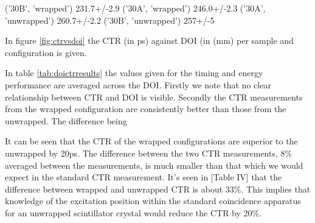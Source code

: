 ('30B', 'wrapped') 231.7+/-2.9
('30A', 'wrapped') 246.0+/-2.3
('30A', 'unwrapped') 260.7+/-2.2
('30B', 'unwrapped') 257+/-5

In figure \ref{fig:ctrvsdoi} the CTR (in ps) against DOI (in (mm) per sample and configuration is given. 

In table \ref{tab:doictrresults} the values given for the timing and energy performance are averaged across the DOI. Firstly we note that no clear relationship between CTR and DOI is visible. Secondly the CTR measurements from the wrapped configuration are consistently better than those from the unwrapped. The difference being 


It can be seen that the CTR of the wrapped configurations are superior to the unwrapped by 20ps. The difference between the two CTR measurements, 8\% averaged between the measurements, is much smaller than that which we would expect in the standard CTR measurement. It's seen in [Table IV]\cite{r_Paganoni_Pauwels_et_al__2011} that the difference between wrapped and unwrapped CTR is about 33\%. This implies that knowledge of the excitation position within the standard coincidence apparatus for an unwrapped scintillator crystal would reduce the CTR by 20\%. 

